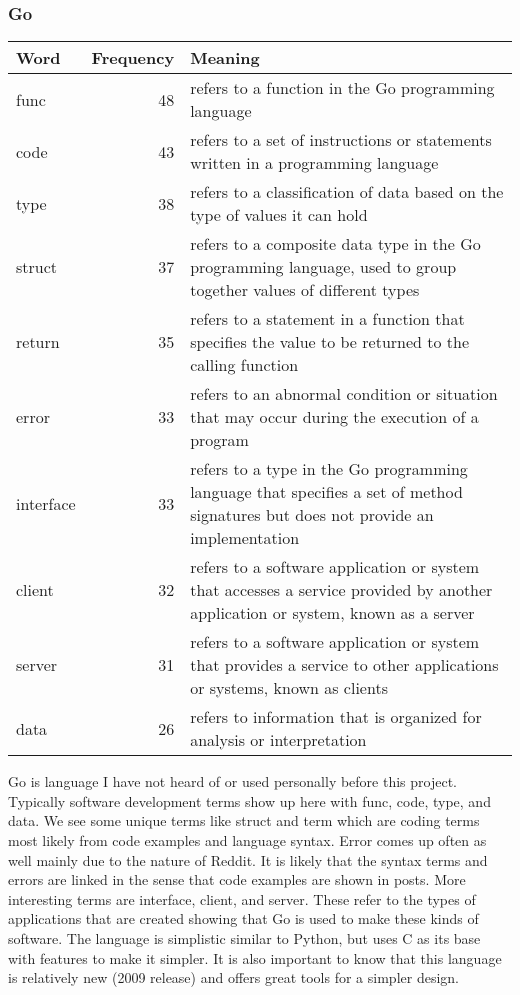 \documentclass{article}
\theoremstyle{theorem}
\theoremstyle{definition}
\theoremstyle{remark}
\begin{document}
\subsubsection{Go}
\begin{tabular}{ | l | r | p{7cm} | }
\hline
Word & Frequency & Meaning \\
\hline
func & 48 & refers to a function in the Go programming language \\
\hline
code & 43 & refers to a set of instructions or statements written in a programming language \\
\hline
type & 38 & refers to a classification of data based on the type of values it can hold \\
\hline
struct & 37 & refers to a composite data type in the Go programming language, used to group together values of different types \\
\hline
return & 35 & refers to a statement in a function that specifies the value to be returned to the calling function \\
\hline
error & 33 & refers to an abnormal condition or situation that may occur during the execution of a program \\
\hline
interface & 33 & refers to a type in the Go programming language that specifies a set of method signatures but does not provide an implementation \\
\hline
client & 32 & refers to a software application or system that accesses a service provided by another application or system, known as a server \\
\hline
server & 31 & refers to a software application or system that provides a service to other applications or systems, known as clients \\
\hline
data & 26 & refers to information that is organized for analysis or interpretation \\
\hline
\end{tabular}

\medskip
Go is language I have not heard of or used personally before this project.  Typically software development terms show up here with func, code, type, and data. We see some unique terms like struct and term which are coding terms most likely from code examples and language syntax. Error comes up often as well mainly due to the nature of Reddit. It is likely that the syntax terms and errors are linked in the sense that code examples are shown in posts. More interesting terms are interface, client, and server. These refer to the types of applications that are created showing that Go is used to make these kinds of software. The language is simplistic similar to Python, but uses C as its base with features to make it simpler. It is also important to know that this language is relatively new (2009 release) and offers great tools for a simpler design.
\end{document}
